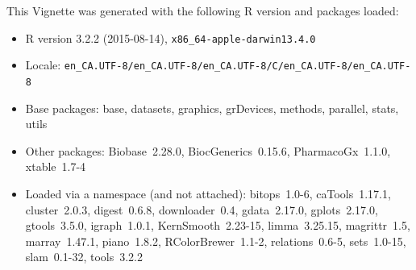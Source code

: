 \documentclass[11pt]{article}
\begin{document}
This Vignette was generated with the following R version and packages loaded:

\begin{itemize}\raggedright
  \item R version 3.2.2 (2015-08-14), \verb|x86_64-apple-darwin13.4.0|
  \item Locale: \verb|en_CA.UTF-8/en_CA.UTF-8/en_CA.UTF-8/C/en_CA.UTF-8/en_CA.UTF-8|
  \item Base packages: base, datasets, graphics, grDevices, methods,
    parallel, stats, utils
  \item Other packages: Biobase~2.28.0, BiocGenerics~0.15.6,
    PharmacoGx~1.1.0, xtable~1.7-4
  \item Loaded via a namespace (and not attached): bitops~1.0-6,
    caTools~1.17.1, cluster~2.0.3, digest~0.6.8, downloader~0.4,
    gdata~2.17.0, gplots~2.17.0, gtools~3.5.0, igraph~1.0.1,
    KernSmooth~2.23-15, limma~3.25.15, magrittr~1.5, marray~1.47.1,
    piano~1.8.2, RColorBrewer~1.1-2, relations~0.6-5, sets~1.0-15,
    slam~0.1-32, tools~3.2.2
\end{itemize}


\end{document}
